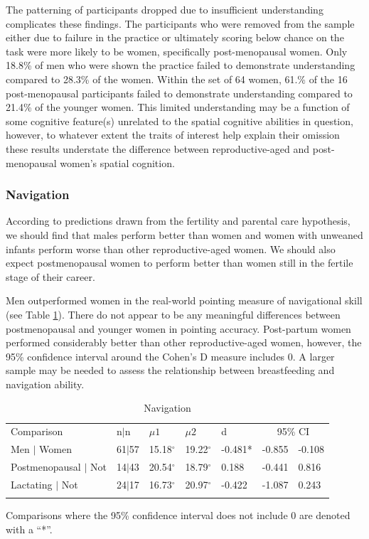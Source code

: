 The patterning of participants dropped due to insufficient understanding complicates these findings.  The participants who were removed from the sample either due to failure in the practice or ultimately scoring below chance on the task were more likely to be women, specifically post-menopausal women.  Only 18.8\% of men who were shown the practice failed to demonstrate understanding compared to 28.3\% of the women.  Within the set of 64 women, 61.\% of the 16 post-menopausal participants failed to demonstrate understanding compared to 21.4\% of the younger women.  This limited understanding may be a function of some cognitive feature(s) unrelated to the spatial cognitive abilities in question, however, to whatever extent the traits of interest help explain their omission these results understate the difference between reproductive-aged and post-menopausal women's spatial cognition.


		\subsubsection{Navigation}
		\label{sec:3.1.2}

According to predictions drawn from the fertility and parental care hypothesis, we should find that males perform better than women and women with unweaned infants perform worse than other reproductive-aged women.  We should also expect postmenopausal women to perform better than women still in the fertile stage of their career.

Men outperformed women in the real-world pointing measure of navigational skill (see Table \ref{tab:nav}).  There do not appear to be any meaningful differences between postmenopausal and younger women in pointing accuracy.  Post-partum women performed considerably better than other reproductive-aged women, however, the 95\% confidence interval around the Cohen's D measure includes 0.  A larger sample may be needed to assess the relationship between breastfeeding and navigation ability.

\begin{table}[h!]
\caption{Navigation}
\label{tab:nav}  
\begin{tabular}{lllllll}
\hline\noalign{\smallskip}
Comparison & \phantom{0}n$|$n & $\mu1$ & $\mu2$ & d & \multicolumn{2}{c}{95\% CI} \\
\noalign{\smallskip}\hline\noalign{\smallskip}
Men $|$ Women & 61$|$57 & 15.18$^{\circ}$ & 19.22$^{\circ}$ & -0.481* & -0.855 & -0.108 \\
Postmenopausal $|$ Not & 14$|$43 & 20.54$^{\circ}$ & 18.79$^{\circ}$  & \phantom{-}0.188 & -0.441 & \phantom{-}0.816\\
Lactating $|$ Not & 24$|$17 & 16.73$^{\circ}$ & 20.97$^{\circ}$  & -0.422 & -1.087 & \phantom{-}0.243 \\
\noalign{\smallskip}\hline
\end{tabular}\par
\bigskip
Comparisons where the 95\% confidence interval does not include 0 are denoted with a ``*''.
\end{table}		  

